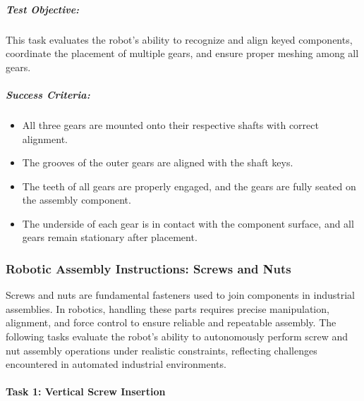 \documentclass[letterpaper,10pt,english]{sphinxmanual}
\begin{document}
\subparagraph{Test Objective:}
\label{\detokenize{robotic_instructions_gear_tasks:id5}}
\sphinxAtStartPar
This task evaluates the robot’s ability to recognize and align keyed components,
coordinate the placement of multiple gears, and ensure proper meshing among all gears.


\subparagraph{Success Criteria:}
\label{\detokenize{robotic_instructions_gear_tasks:id6}}\begin{itemize}
\item {} 
\sphinxAtStartPar
All three gears are mounted onto their respective shafts with correct alignment.

\item {} 
\sphinxAtStartPar
The grooves of the outer gears are aligned with the shaft keys.

\item {} 
\sphinxAtStartPar
The teeth of all gears are properly engaged, and the gears are fully seated on the assembly component.

\item {} 
\sphinxAtStartPar
The underside of each gear is in contact with the component surface, and all gears remain stationary after placement.

\end{itemize}

\sphinxstepscope


\subsubsection{Robotic Assembly Instructions: Screws and Nuts}
\label{\detokenize{robotic_instructions_screws_and_nuts:robotic-assembly-instructions-screws-and-nuts}}\label{\detokenize{robotic_instructions_screws_and_nuts::doc}}
\sphinxAtStartPar
Screws and nuts are fundamental fasteners used to join components in industrial assemblies.
In robotics, handling these parts requires precise manipulation, alignment, and force control to ensure reliable and repeatable assembly.
The following tasks evaluate the robot’s ability to autonomously perform screw and nut assembly operations under realistic constraints,
reflecting challenges encountered in automated industrial environments.


\paragraph{Task 1: Vertical Screw Insertion}
\label{\detokenize{robotic_instructions_screws_and_nuts:task-1-vertical-screw-insertion}}
\end{document}
